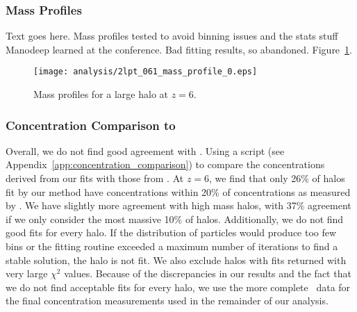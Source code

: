 \subsubsection{Mass Profiles}
\label{subsubsec:analysis--profile_fitting--mass_profiles}


Text goes here.  Mass profiles tested to avoid binning issues and the stats stuff Manodeep learned at the conference.  Bad fitting results, so abandoned.  Figure~\ref{fig:mass_profile}.

\begin{figure}[t]
	\centering
	\texttt{[image: analysis/2lpt\_061\_mass\_profile\_0.eps]}
	\caption[Mass profiles a large halo at $z = 6$.]{\footnotesize Mass profiles for a large halo at $z = 6$.  }
	\label{fig:mass_profile}
\end{figure}



\subsubsection{Concentration Comparison to \rockstar}
\label{subsubsec:analysis--profile_fitting--rockstar_comparison}


Overall, we do not find good agreement with \rockstar.  Using a script (see Appendix~\ref{app:concentration_comparison}) to compare the concentrations derived from our fits with those from \rockstar.  At $z = 6$, we find that only 26\% of halos fit by our method have concentrations within 20\% of concentrations as measured by \rockstar.  We have slightly more agreement with high mass halos, with 37\% agreement if we only consider the most massive 10\% of halos.  Additionally, we do not find good fits for every halo.  If the distribution of particles would produce too few bins or the fitting routine exceeded a maximum number of iterations to find a stable solution, the halo is not fit.  We also exclude halos with fits returned with very large $\chi^{2}$ values.  Because of the discrepancies in our results and the fact that we do not find acceptable fits for every halo, we use the more complete \rockstar\ data for the final concentration measurements used in the remainder of our analysis.




